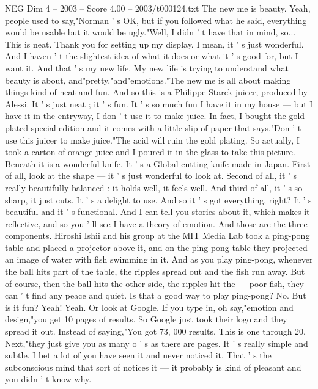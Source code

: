 \begin{textsample}{NEG Dim 4 – 2003 – Score 4.00 – 2003/t000124.txt}  \label{ex:f4_neg_048}
The new me is beauty.
Yeah, people used to say,"Norman ' s OK, but if you followed what he said, everything would be usable but it would be ugly."Well, I didn ' t have that in mind, so...
This is neat.
Thank you for setting up my display.
I mean, it ' s just wonderful.
And I haven ' t the slightest idea of what it does or what it ' s good for, but I want it.
And that ' s my new life.
My new life is trying to understand what beauty is about, and"pretty,"and"emotions."The new me is all about making things kind of neat and fun.
And so this is a Philippe Starck juicer, produced by Alessi.
It ' s just neat ; it ' s fun.
It ' s so much fun I have it in my house — but I have it in the entryway, I don ' t use it to make juice.
In fact, I bought the gold-plated special edition and it comes with a little slip of paper that says,"Don ' t use this juicer to make juice."The acid will ruin the gold plating.
So actually, I took a carton of orange juice and I poured it in the glass to take this picture.
Beneath it is a wonderful knife.
It ' s a Global cutting knife made in Japan.
First of all, look at the shape — it ' s just wonderful to look at.
Second of all, it ' s really beautifully balanced : it holds well, it feels well.
And third of all, it ' s so sharp, it just cuts.
It ' s a delight to use.
And so it ' s got everything, right?
It ' s beautiful and it ' s functional.
And I can tell you stories about it, which makes it reflective, and so you ' ll see I have a theory of emotion.
And those are the three components.
Hiroshi Ishii and his group at the MIT Media Lab took a ping-pong table and placed a projector above it, and on the ping-pong table they projected an image of water with fish swimming in it.
And as you play ping-pong, whenever the ball hits part of the table, the ripples spread out and the fish run away.
But of course, then the ball hits the other side, the ripples hit the — poor fish, they can ' t find any peace and quiet.
Is that a good way to play ping-pong?
No.
But is it fun?
Yeah!
Yeah.
Or look at Google.
If you type in, oh say,"emotion and design,"you get 10 pages of results.
So Google just took their logo and they spread it out.
Instead of saying,"You got 73, 000 results.
This is one through 20.
Next,"they just give you as many o ' s as there are pages.
It ' s really simple and subtle.
I bet a lot of you have seen it and never noticed it.
That ' s the subconscious mind that sort of notices it — it probably is kind of pleasant and you didn ' t know why.

\end{textsample}
